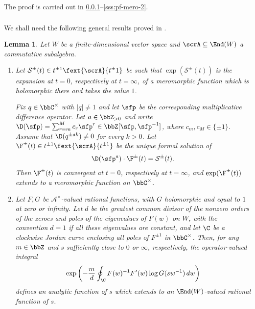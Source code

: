 \documentclass[reqno]{amsart}
\numberwithin{equation}{section}
\newtheorem*{lemma}{Lemma}
\begin{document}
The proof is carried out in \ref{sss:complex-analysis-lemma}--\ref{sss:pf-mero-2}.

\subsubsection{}\label{sss:complex-analysis-lemma} We shall need the following general results proved in \cite{gautam-toledano-17,appel-gautam-26}.

\begin{lemma}\label{lem:bK0-complex-analysis}
Let $W$ be a finite-dimensional vector space and $\scrA\subseteq\End(W)$ a commutative subalgebra. 
\begin{enumerate}[leftmargin=2em]\itemsep0.25cm
	\item \label{lem:bK0-meromorphic-summation}
	Let $\mathcal S^\pm(t)\in t^{\pm1}\fext{\scrA}{t^\pm1}$ be
	such that $\exp(\mathcal S^\pm(t))$ is the expansion at $t=0$,
	respectively at $t=\infty$, of a meromorphic function which is
	holomorphic there and takes the value $1$.
	
	Fix $q\in\bbC^\times$ with $|q|\neq1$ and let $\sfp$ be the corresponding multiplicative difference operator. Let $a\in\bbZ_{>0}$ and write
	$\D(\sfp)=\sum_{r=m}^{M}c_r\sfp^r\in{\bbZ}[\sfp,\sfp^{-1}]$, where
	$c_m,c_M\in\{\pm1\}$. Assume that
	$\D(q^{\pm ak})\neq0$ for every $k>0$.
	Let
	$\F^\pm(t)\in{t^{\pm1}}\fext{\scrA}{t^{\pm1}}$ be the unique formal solution of
	\begin{equation}\label{eq:bK0-general-difference-equation}
		\D(\sfp^a)\cdot \F^\pm(t)=\mathcal S^\pm(t).
	\end{equation}
	Then $\F^\pm(t)$ is convergent at $t=0$,
	respectively at $t=\infty$, and
	$\exp(\F^\pm(t))$ extends to a meromorphic function on
	$\bbC^\times$.
	
	\item \label{lem:bK0-logarithmic-pairing}
	Let $F, G$ be $\mathscr{A}^\times$-valued rational functions, with $G$ holomorphic and equal to $1$ at zero or infinity. Let $d$ be the greatest common divisor of the nonzero orders of the zeroes and poles of the eigenvalues of $F(w)$ on $W$, with the convention $d=1$ if all these eigenvalues are constant, and let $\C$ be a clockwise Jordan curve enclosing all poles of $F^{\pm 1}$ in $\bbC^\times$. Then, for any $m\in\bbZ$ and $s$ sufficiently close to $0$ or $\infty$, respectively, the operator-valued integral
	\[
	\exp\left(
	-\frac{m}{d}\oint_{\C}
	F(w)^{-1}F'(w)\log G(sw^{-1})\,dw
	\right)
	\]
	defines an analytic function of $s$ which extends to an
	$\End(W)$-valued rational function of $s$.
\end{enumerate}
\end{lemma}
\end{document}
